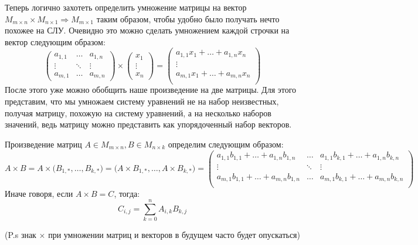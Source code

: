 Теперь логично захотеть определить умножение матрицы на вектор $M_{m\times n}\times M_{n\times 1}\Rightarrow M_{m\times 1}$ таким образом, чтобы удобно было получать нечто похожее на СЛУ.
Очевидно это можно сделать умножением каждой строчки на вектор следующим образом:
$$
\begin{pmatrix}
a_{1,1}&\dots&a_{1,n}\\
\vdots&\ddots&\vdots\\
a_{m,1}&\dots&a_{m,n}
\end{pmatrix}\times
\begin{pmatrix}
x_1\\
\vdots\\
x_n
\end{pmatrix} = 
\begin{pmatrix}
a_{1,1}x_1 +\dots+ a_{1,n}x_n\\
\vdots\\
a_{m,1}x_1 +\dots+ a_{m,n}x_n\\
\end{pmatrix}
$$
После этого уже можно обобщить наше произведение на две матрицы. Для этого представим, что 
мы умножаем систему уравнений не на набор неизвестных, получая матрицу, похожую на систему
уравнений, а на несколько наборов значений, ведь матрицу можно представить как
упорядоченный набор векторов.
\begin{defn}
    Произведение матриц $A\in M_{m\times n}, B\in M_{n\times k}$ определим следующим образом:
    $$
    A\times B = 
    A\times \big( B_{1,*},\dots,B_{k,*} \big) = 
    \big(A\times B_{1,*}, \dots, A\times B_{k,*}\big)=
    \begin{pmatrix}
        a_{1,1}b_{1,1} +\dots+ a_{1,n}b_{1,n} & \dots & a_{1,1}b_{k,1} +\dots+ a_{1,n}b_{k,n}\\
        \vdots & \ddots & \vdots\\
        a_{m,1}b_{1,1} +\dots+ a_{m,n}b_{1,n} & \dots & a_{m,1}b_{k,1} +\dots+ a_{m,n}b_{k,n}\\
    \end{pmatrix}
    $$
    Иначе говоря, если $A\times B = C$, тогда: $$C_{i,j} = \sum_{k=0}^{n}A_{i,k}B_{k,j}$$
\end{defn}
\rem
    (P.s знак $\times$ при умножении матриц и векторов в будущем часто будет опускаться)
\rem
